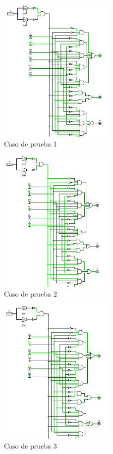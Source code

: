 \documentclass[a4paper]{article}
\begin{document}
\begin{figure}[!htbp]
    \centering
    \includegraphics[width=0.5\textwidth]{caso1.png}
    \caption{Caso de prueba 1}
    \label{fig:Caso1}
\end{figure}
\begin{figure}[!htbp]
    \centering
    \includegraphics[width=0.5\textwidth]{caso2.png}
    \caption{Caso de prueba 2}
    \label{fig:Caso2}
\end{figure}
\begin{figure}[!htbp]
    \centering
    \includegraphics[width=0.5\textwidth]{caso3.png}
    \caption{Caso de prueba 3}
    \label{fig:Caso3}
\end{figure}
\end{document}
